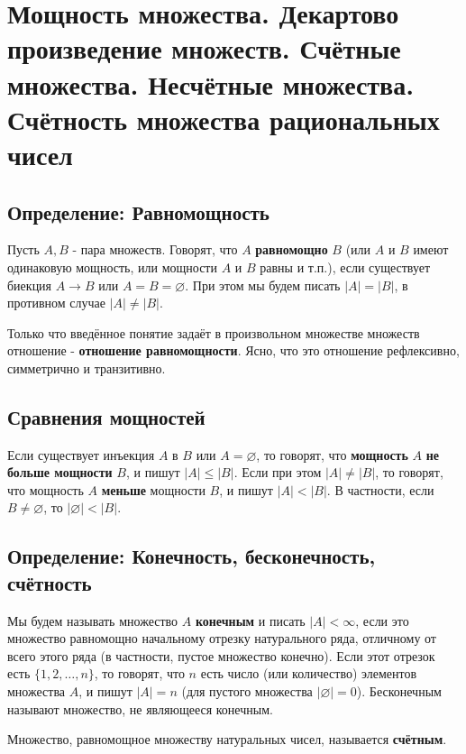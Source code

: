 \documentclass{article}
\begin{document}
\newpage
\section{Мощность множества. Декартово произведение множеств. Счётные множества. Несчётные множества. Счётность множества рациональных чисел}

\subsection{Определение: Равномощность}

Пусть $A, B$ - пара множеств. Говорят, что $A$ \textbf{равномощно} $B$ (или $A$ и $B$ имеют одинаковую мощность, или мощности $A$ и $B$ равны и т.п.), если существует биекция $A \rightarrow B$ или $A = B = \varnothing$. При этом мы будем писать $|A| = |B|$, в противном случае $|A|\neq|B|$.

Только что введённое понятие задаёт в произвольном множестве множеств отношение - \textbf{отношение равномощности}. Ясно, что это отношение рефлексивно, симметрично и транзитивно.

\subsection{Сравнения мощностей}

Если существует инъекция $A$ в $B$ или $A = \varnothing$, то говорят, что \textbf{мощность} $A$ \textbf{не больше мощности} $B$, и пишут $|A| \leq |B|$. Если при этом $|A| \neq |B|$, то говорят, что мощность $A$ \textbf{меньше} мощности $B$, и пишут $|A| < |B|$. В частности, если $B \neq \varnothing$, то $|\varnothing| < |B|$.

\subsection{Определение: Конечность, бесконечность, счётность}

Мы будем называть множество $A$ \textbf{конечным} и писать $|A| < \infty$, если это множество равномощно начальному отрезку натурального ряда, отличному от всего этого ряда (в частности, пустое множество конечно). Если этот отрезок есть $\{1, 2, \dots, n\}$, то говорят, что $n$ есть число (или количество) элементов множества $A$, и пишут $|A| = n$ (для пустого множества $|\varnothing| = 0$). Бесконечным называют множество, не являющееся конечным.

Множество, равномощное множеству натуральных чисел, называется \textbf{счётным}.
\end{document}
